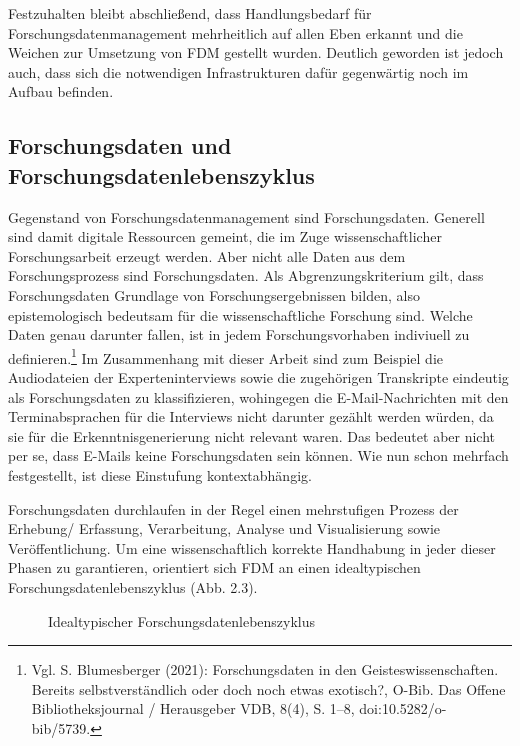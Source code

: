 Festzuhalten bleibt abschließend, dass Handlungsbedarf für Forschungsdatenmanagement mehrheitlich auf allen Eben erkannt und die Weichen zur Umsetzung von FDM gestellt wurden. Deutlich geworden ist jedoch auch, dass sich die notwendigen Infrastrukturen dafür gegenwärtig noch im Aufbau befinden.   

\subsection{Forschungsdaten und Forschungsdatenlebenszyklus}

Gegenstand von Forschungsdatenmanagement sind Forschungsdaten. Generell sind damit digitale Ressourcen gemeint, die im Zuge wissenschaftlicher Forschungsarbeit erzeugt werden. Aber nicht alle Daten aus dem Forschungsprozess sind Forschungsdaten. Als Abgrenzungskriterium gilt, dass Forschungsdaten Grundlage von Forschungsergebnissen bilden, also epistemologisch bedeutsam für die wissenschaftliche Forschung sind. Welche Daten genau darunter fallen, ist in jedem Forschungsvorhaben indiviuell zu definieren.\footnote{Vgl. S. Blumesberger (2021): Forschungsdaten in den Geisteswissenschaften. Bereits selbstverständlich oder doch noch etwas exotisch?, O-Bib. Das Offene Bibliotheksjournal / Herausgeber VDB, 8(4), S. 1–8, doi:10.5282/o-bib/5739.} Im Zusammenhang mit dieser Arbeit sind zum Beispiel die Audiodateien der Experteninterviews sowie die zugehörigen Transkripte eindeutig als Forschungsdaten zu klassifizieren, wohingegen die E-Mail-Nachrichten mit den Terminabsprachen für die Interviews nicht darunter gezählt werden würden, da sie für die Erkenntnisgenerierung nicht relevant waren. Das bedeutet aber nicht per se, dass E-Mails keine Forschungsdaten sein können. Wie nun schon mehrfach festgestellt, ist diese Einstufung kontextabhängig.

Forschungsdaten durchlaufen in der Regel einen mehrstufigen Prozess der Erhebung/ Erfassung, Verarbeitung, Analyse und Visualisierung sowie Veröffentlichung. Um eine wissenschaftlich korrekte Handhabung in jeder dieser Phasen zu garantieren, orientiert sich FDM an einen idealtypischen Forschungsdatenlebenszyklus (Abb. 2.3).

\begin{figure}[h]
    \centering
    \caption{Idealtypischer Forschungsdatenlebenszyklus\protect\footnotemark}
    \label{fig:x cubed graph}
\end{figure} 

